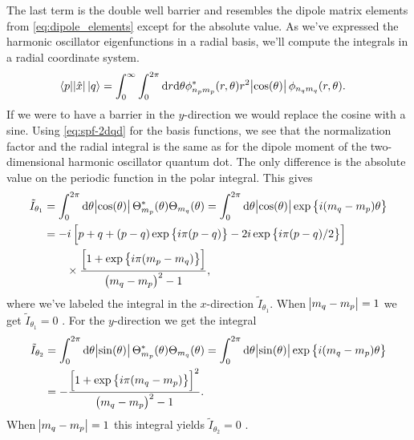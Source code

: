         The last term is the double well barrier and resembles the dipole matrix
        elements from \autoref{eq:dipole_elements} except for the absolute
        value.
        As we've expressed the harmonic oscillator eigenfunctions in a radial
        basis, we'll compute the integrals in a radial coordinate system.
        \begin{align}
            \langle p |\abs{\hat{x}}| q \rangle
            &=
            \int_{0}^{\infty}\int_{0}^{2\pi}
            \mathrm{d} r \mathrm{d}\theta
            \phi_{n_p m_p}^{*}(r, \theta)
            r^2\abs{\cos(\theta)}
            \phi_{n_q m_q}(r, \theta).
        \end{align}
        If we were to have a barrier in the $y$-direction we would replace the
        cosine with a sine.
        Using \autoref{eq:spf-2dqd} for the basis functions, we see that the
        normalization factor and the radial integral is the same as for the
        dipole moment of the two-dimensional harmonic oscillator quantum dot.
        The only difference is the absolute value on the periodic function in
        the polar integral.
        This gives \cite{wolframalphatildei1}
        \begin{align}
            \tilde{I}_{\theta_1}
            &=
            \int_{0}^{2\pi}\mathrm{d} \theta \abs{\cos(\theta)}
            \Theta_{m_p}^{*}(\theta)
            \Theta_{m_q}(\theta)
            =
            \int_{0}^{2\pi}\mathrm{d} \theta \abs{\cos(\theta)}
            \exp\left\{ i(m_q - m_p)\theta \right\}
            \\
            &=
            -i\left[ 
                p + q
                + (p - q)\exp\left\{ i\pi(p - q) \right\}
                - 2i\exp\left\{ 
                    i\pi(p - q)/2
                 \right\}
             \right]
            \\
            &\qquad
            \times
            \frac{
                \left[ 
                    1 + \exp\left\{ i\pi(m_p - m_q) \right\}
                 \right]
            }{
                \left( m_q - m_p \right)^2 - 1
            },
        \end{align}
        where we've labeled the integral in the $x$-direction
        $\tilde{I}_{\theta_1}$.
        When $\abs{m_q - m_p} = 1$ we get $\tilde{I}_{\theta_1} = 0$
        \cite{wolframalphatildei1-zero}.
        For the $y$-direction we get the integral \cite{wolframalphatildei2}
        \begin{align}
            \tilde{I}_{\theta_2}
            &=
            \int_{0}^{2\pi}\mathrm{d} \theta \abs{\sin(\theta)}
            \Theta_{m_p}^{*}(\theta)
            \Theta_{m_q}(\theta)
            =
            \int_{0}^{2\pi}\mathrm{d} \theta \abs{\sin(\theta)}
            \exp\left\{ i(m_q - m_p)\theta \right\}
            \\
            &=
            -\frac{
                \left[ 
                    1 + \exp\left\{ i \pi (m_q - m_p) \right\}
                 \right]^2
            }{
                \left( m_q - m_p \right)^2 - 1
            }.
        \end{align}
        When $\abs{m_q - m_p} = 1$ this integral yields $\tilde{I}_{\theta_2} =
        0$ \cite{wolframalphatildei2-zero}.

